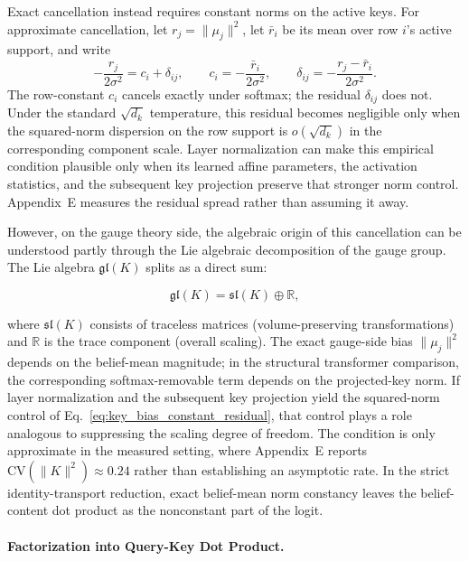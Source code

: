 \documentclass[twoside,11pt]{article}
\begin{document}
Exact cancellation instead requires constant norms on the active keys. For approximate cancellation, let $r_j=\|\mu_j\|^2$, let $\bar r_i$ be its mean over row $i$'s active support, and write
\begin{equation}
-\frac{r_j}{2\sigma^2}=c_i+\delta_{ij},
\qquad
c_i=-\frac{\bar r_i}{2\sigma^2},
\qquad
\delta_{ij}=-\frac{r_j-\bar r_i}{2\sigma^2}.
\label{eq:key_bias_constant_residual}
\end{equation}
The row-constant $c_i$ cancels exactly under softmax; the residual $\delta_{ij}$ does not. Under the standard $\sqrt{d_k}$ temperature, this residual becomes negligible only when the squared-norm dispersion on the row support is $o(\sqrt{d_k})$ in the corresponding component scale. Layer normalization \citep{ba2016layernorm} can make this empirical condition plausible only when its learned affine parameters, the activation statistics, and the subsequent key projection preserve that stronger norm control. Appendix~E measures the residual spread rather than assuming it away.

However, on the gauge theory side, the algebraic origin of this cancellation can be understood partly through the Lie algebraic decomposition of the gauge group. The Lie algebra $\mathfrak{gl}(K)$ splits as a direct sum:

\begin{equation}
\mathfrak{gl}(K) = \mathfrak{sl}(K) \oplus \mathbb{R},
\label{eq:gl_decomposition}
\end{equation}

where $\mathfrak{sl}(K)$ consists of traceless matrices (volume-preserving transformations) and $\mathbb{R}$ is the trace component (overall scaling). The exact gauge-side bias $\|\mu_j\|^2$ depends on the belief-mean magnitude; in the structural transformer comparison, the corresponding softmax-removable term depends on the projected-key norm. If layer normalization and the subsequent key projection yield the squared-norm control of Eq.~\eqref{eq:key_bias_constant_residual}, that control plays a role analogous to suppressing the scaling degree of freedom. The condition is only approximate in the measured setting, where Appendix~E reports $\mathrm{CV}(\|K\|^2) \approx 0.24$ rather than establishing an asymptotic rate. In the strict identity-transport reduction, exact belief-mean norm constancy leaves the belief-content dot product as the nonconstant part of the logit.

\paragraph{Factorization into Query-Key Dot Product.}
\end{document}
